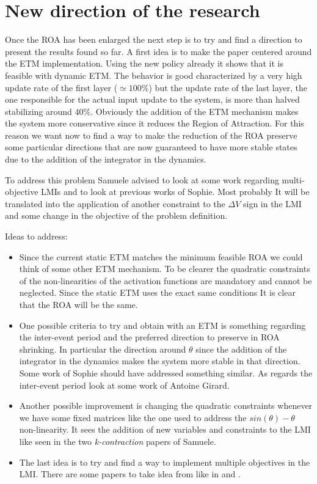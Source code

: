 \documentclass{article}
\begin{document}
\section*{New direction of the research}
Once the ROA has been enlarged the next step is to try and find a direction to present the results found so far. A first idea is to make the paper centered around the ETM implementation. Using the new policy already it shows that it is feasible with dynamic ETM. The behavior is good characterized by a very high update rate of the first layer ($\simeq 100\%$) but the update rate of the last layer, the one responsible for the actual input update to the system, is more than halved stabilizing around $40\%$. Obviously the addition of the ETM mechanism makes the system more conservative since it reduces the Region of Attraction. For this reason we want now to find a way to make the reduction of the ROA preserve some particular directions that are now guaranteed to have more stable states due to the addition of the integrator in the dynamics.

To address this problem Samuele advised to look at some work regarding multi-objective LMIs and to look at previous works of Sophie. Most probably It will be translated into the application of another constraint to the $\Delta V$ sign in the LMI and some change in the objective of the problem definition. 

Ideas to address:
\begin{itemize}
  \item Since the current static ETM matches the minimum feasible ROA we could think of some other ETM mechanism. To be clearer the quadratic constraints of the non-linearities of the activation functions are mandatory and cannot be neglected. Since the static ETM uses the exact same conditions It is clear that the ROA will be the same. 
  \item One possible criteria to try and obtain with an ETM is something regarding the inter-event period and the preferred direction to preserve in ROA shrinking. In particular the direction around $\theta$ since the addition of the integrator in the dynamics makes the system more stable in that direction. Some work of Sophie should have addressed something similar. As regards the inter-event period look at some work of Antoine Girard.
  \item Another possible improvement is changing the quadratic constraints whenever we have some fixed matrices like the one used to address the $sin(\theta) - \theta$ non-linearity. It sees the addition of new variables and constraints to the LMI like seen in the two \textit{k-contraction} papers of Samuele.
  \item The last idea is to try and find a way to implement multiple objectives in the LMI. There are some papers to take idea from like in \cite{multiobjective-1} and \cite{multiobjective-2}.
\end{itemize}
\end{document}
